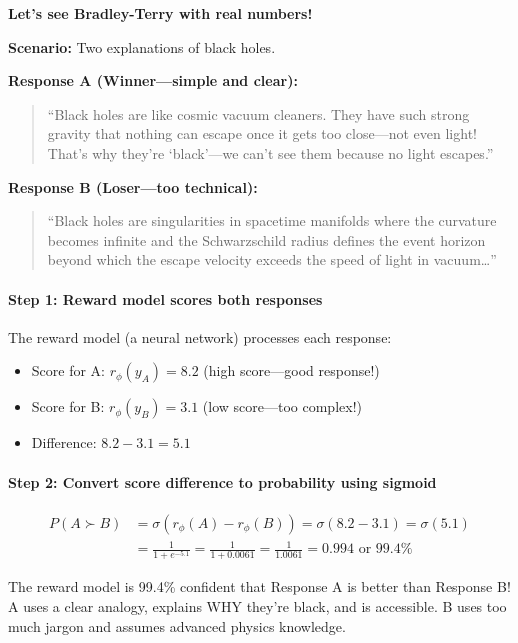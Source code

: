 \begin{chapterenv}
\textbf{Let's see Bradley-Terry with real numbers!}

\textbf{Scenario:} Two explanations of black holes.

\textbf{Response A (Winner---simple and clear):}
\begin{quote}
``Black holes are like cosmic vacuum cleaners. They have such strong gravity that nothing can escape once it gets too close---not even light! That's why they're `black'---we can't see them because no light escapes.''
\end{quote}

\textbf{Response B (Loser---too technical):}
\begin{quote}
``Black holes are singularities in spacetime manifolds where the curvature becomes infinite and the Schwarzschild radius defines the event horizon beyond which the escape velocity exceeds the speed of light in vacuum\ldots''
\end{quote}

\paragraph{Step 1: Reward model scores both responses}

The reward model (a neural network) processes each response:

\begin{itemize}[nosep]
    \item Score for A: $r_\phi(y_A) = 8.2$ (high score---good response!)
    \item Score for B: $r_\phi(y_B) = 3.1$ (low score---too complex!)
    \item Difference: $8.2 - 3.1 = 5.1$
\end{itemize}

\paragraph{Step 2: Convert score difference to probability using sigmoid}

\begin{align*}
P(A \succ B) &= \sigma(r_\phi(A) - r_\phi(B)) = \sigma(8.2 - 3.1) = \sigma(5.1) \\
&= \frac{1}{1 + e^{-5.1}} = \frac{1}{1 + 0.0061} = \frac{1}{1.0061} = 0.994 \text{ or } 99.4\%
\end{align*}

\begin{tipbox}
The reward model is 99.4\% confident that Response A is better than Response B! A uses a clear analogy, explains WHY they're black, and is accessible. B uses too much jargon and assumes advanced physics knowledge.
\end{tipbox}


\end{chapterenv}
